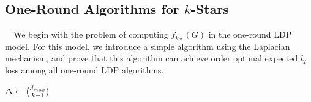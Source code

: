 \subsection{One-Round Algorithms for $k$-Stars}
\label{chap1-sub:non-interactive_k_stars}

~~We begin with the problem of computing $f_{k\star}(G)$ in the 
one-round 
LDP model. 
For this model, we introduce a simple algorithm using the Laplacian mechanism, and prove that this algorithm can achieve order optimal expected $l_2$ loss among all one-round LDP algorithms. 

\setlength{\algomargin}{4mm}
\begin{algorithm}
  \SetAlgoLined
  $\Delta \leftarrow \binom{\tilde{d}_{max}}{k-1}$\;
  \caption{\label{chap1-alg:k-stars}}
\end{algorithm}


